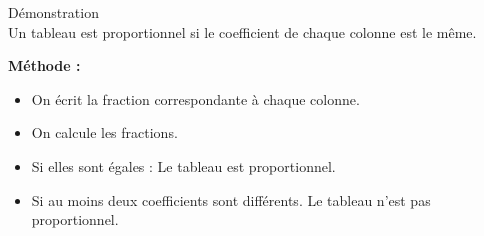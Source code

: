 \begin{Definition}{Démonstration}\\
  Un tableau est proportionnel si le coefficient de chaque colonne est le même. 
\end{Definition}

\textbf{Méthode : }
\begin{itemize}[label={$\bullet$}]
  \item On écrit la fraction correspondante à chaque colonne.
  \item On calcule les fractions.
  \item Si elles sont égales : Le tableau est proportionnel.
  \item Si au moins deux coefficients sont différents. Le tableau n'est pas proportionnel.
\end{itemize}  

